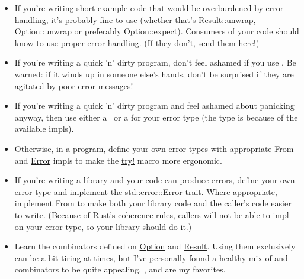 \begin{itemize}
  \item{If you're writing short example code that would be overburdened by error handling, it's probably fine to use 
       (whether that's \href{https://doc.rust-lang.org/std/result/enum.Result.html\#method.unwrap}{Result::unwrap}, 
      \href{https://doc.rust-lang.org/std/option/enum.Option.html\#method.unwrap}{Option::unwrap} or preferably 
      \href{https://doc.rust-lang.org/std/option/enum.Option.html\#method.expect}{Option::expect}). Consumers of your code 
      should know to use proper error handling. (If they don't, send them here!)}
  \item{If you're writing a quick 'n' dirty program, don't feel ashamed if you use . Be warned: if it winds 
      up in someone else's hands, don't be surprised if they are agitated by poor error messages!}
  \item{If you're writing a quick 'n' dirty program and feel ashamed about panicking anyway, then use either a \String\ or 
      a  for your error type (the  type is because of the 
      available  impls).}
  \item{Otherwise, in a program, define your own error types with appropriate 
      \href{https://doc.rust-lang.org/std/convert/trait.From.html}{From} and 
      \href{https://doc.rust-lang.org/std/error/trait.Error.html}{Error} impls to make the 
      \href{https://doc.rust-lang.org/std/macro.try!.html}{try!} macro more ergonomic.}
  \item{If you're writing a library and your code can produce errors, define your own error type and implement the 
      \href{https://doc.rust-lang.org/std/error/trait.Error.html}{std::error::Error} trait. Where appropriate, implement 
      \href{https://doc.rust-lang.org/std/convert/trait.From.html}{From} to make both your library code and the caller's 
      code easier to write. (Because of Rust's coherence rules, callers will not be able to impl  on your error 
      type, so your library should do it.)}
  \item{Learn the combinators defined on \href{https://doc.rust-lang.org/std/option/enum.Option.html}{Option} and 
      \href{https://doc.rust-lang.org/std/result/enum.Result.html}{Result}. Using them exclusively can be a bit tiring at 
      times, but I've personally found a healthy mix of  and combinators to be quite appealing. , 
       and  are my favorites.}
\end{itemize}
